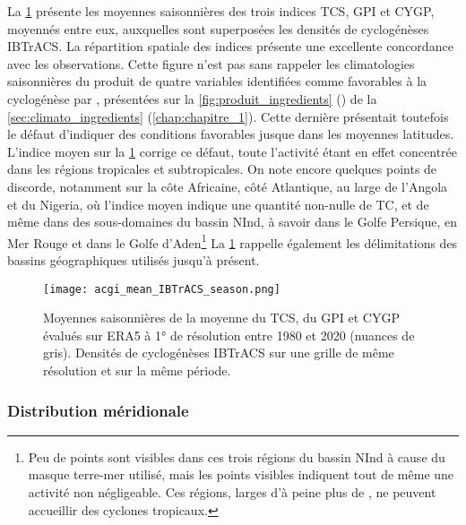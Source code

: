 \documentclass[../main.tex]{subfiles}
\begin{document}
La \cref{fig:acgi_ibt} présente les moyennes saisonnières des trois indices TCS, GPI et CYGP, moyennés entre eux, auxquelles sont superposées les densités de
cyclogénèses IBTrACS. La répartition spatiale des indices présente une excellente concordance avec les observations. Cette figure n'est pas sans rappeler les
climatologies saisonnières du produit de quatre variables identifiées comme favorables à la cyclogénèse par \textcite{gray_tropical_1975}, présentées sur la
\cref{fig:produit_ingredients} () de la \cref{sec:climato_ingredients} (\cref{chap:chapitre_1}). Cette dernière présentait
toutefois le défaut d'indiquer des conditions favorables jusque dans les moyennes latitudes. L'indice moyen sur la \cref{fig:acgi_ibt} corrige ce défaut, toute
l'activité étant en effet concentrée dans les régions tropicales et subtropicales. On note encore quelques points de discorde, notamment sur la côte Africaine,
côté Atlantique, au large de l'Angola et du Nigeria, où l'indice moyen indique une quantité non-nulle de TC, et de même dans des sous-domaines du bassin NInd, à
savoir dans le Golfe Persique, en Mer Rouge et dans le Golfe d'Aden\footnote{Peu de points sont visibles dans ces trois régions du bassin NInd à cause du masque
terre-mer utilisé, mais les points visibles indiquent tout de même une activité non négligeable. Ces régions, larges d'à peine plus de , ne peuvent
accueillir des cyclones tropicaux.} La \cref{fig:acgi_ibt} rappelle également les délimitations des bassins géographiques utilisés jusqu'à présent.

\begin{figure}[p]
    \centering
    \texttt{[image: acgi\_mean\_IBTrACS\_season.png]}
    \caption{Moyennes saisonnières de la moyenne du TCS, du GPI et CYGP évalués sur ERA5 à \ang{1} de résolution entre 1980 et 2020 (nuances de gris). Densités
    de cyclogénèses IBTrACS sur une grille de même résolution et sur la même période.}
    \label{fig:acgi_ibt}
\end{figure}

\subsubsection*{Distribution méridionale}
\end{document}
